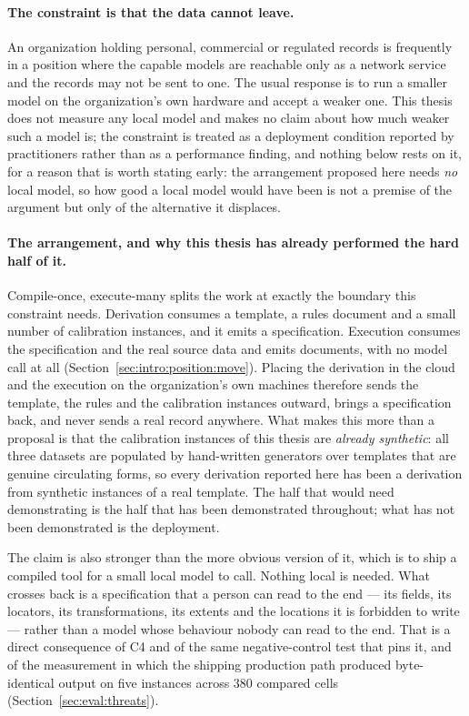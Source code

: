\paragraph{The constraint is that the data cannot leave.}
An organization holding personal, commercial or regulated records is frequently in a position
where the capable models are reachable only as a network service and the records may not be
sent to one. The usual response is to run a smaller model on the organization's own hardware
and accept a weaker one. This thesis does not measure any local model and makes no claim about
how much weaker such a model is; the constraint is treated as a deployment condition reported
by practitioners rather than as a performance finding, and nothing below rests on it, for a
reason that is worth stating early: the arrangement proposed here needs \emph{no} local model,
so how good a local model would have been is not a premise of the argument but only of the
alternative it displaces.

\paragraph{The arrangement, and why this thesis has already performed the hard half of it.}
Compile-once, execute-many splits the work at exactly the boundary this constraint needs.
Derivation consumes a template, a rules document and a small number of calibration instances,
and it emits a specification. Execution consumes the specification and the real source data
and emits documents, with no model call at all
(Section~\ref{sec:intro:position:move}). Placing the derivation in the cloud and the execution
on the organization's own machines therefore sends the template, the rules and the calibration
instances outward, brings a specification back, and never sends a real record anywhere. What
makes this more than a proposal is that the calibration instances of this thesis are
\emph{already synthetic}: all three datasets are populated by hand-written generators over
templates that are genuine circulating forms, so every derivation reported here has been a
derivation from synthetic instances of a real template. The half that would need demonstrating
is the half that has been demonstrated throughout; what has not been demonstrated is the
deployment.

The claim is also stronger than the more obvious version of it, which is to ship a compiled
tool for a small local model to call. Nothing local is needed. What crosses back is a
specification that a person can read to the end --- its fields, its locators, its
transformations, its extents and the locations it is forbidden to write --- rather than a model
whose behaviour nobody can read to the end. That is a direct consequence of C4 and of the same
negative-control test that pins it, and of the measurement in which the shipping production
path produced byte-identical output on five instances across 380 compared cells
(Section~\ref{sec:eval:threats}).

